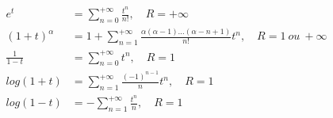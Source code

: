 \begin{align*}
%
		e^t & =  \sum_{n=0}^{+\infty} \frac{t^n}{n!} ,\quad R = +\infty \\ 
%
%
(1 + t)^ {\alpha} & =  1 + \sum ^{+\infty}_{n=1} \frac{\alpha (\alpha - 1)\ldots (\alpha - n + 1)}{n!}t^n,\quad R = 1\ ou\ +\infty  \\ 
	\frac{1}{1 - t} & =  \sum_{n=0}^{+\infty} t^n, \quad R = 1 \\   
		log(1 + t)& =  \sum_{n=1}^{+\infty} \frac{(-1)^{n-1}}{n} t^n ,\quad R = 1 \\
		log(1 - t) & =  -\sum_{n=1}^{+\infty} \frac{t^n}{ n} ,\quad R = 1 \\
%

 \end{align*}
%
%
